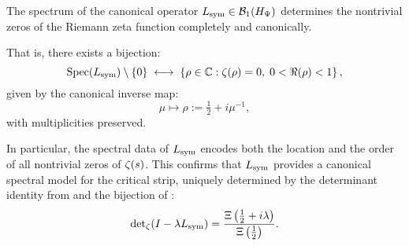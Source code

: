 \begin{corollary}
\label{cor:spectral_determines_zeta}

The spectrum of the canonical operator \( L_{\mathrm{sym}} \in \mathcal{B}_1(H_{\Psi}) \) determines the nontrivial zeros of the Riemann zeta function completely and canonically.

That is, there exists a bijection:
\[
\operatorname{Spec}(L_{\mathrm{sym}}) \setminus \{0\}
\;\longleftrightarrow\;
\left\{ \rho \in \mathbb{C} : \zeta(\rho) = 0, \; 0 < \Re(\rho) < 1 \right\},
\]
given by the canonical inverse map:
\[
\mu \mapsto \rho := \tfrac{1}{2} + i \mu^{-1},
\]
with multiplicities preserved.

\medskip

\noindent
In particular, the spectral data of \( L_{\mathrm{sym}} \) encodes both the location and the order of all nontrivial zeros of \( \zeta(s) \). This confirms that \( L_{\mathrm{sym}} \) provides a canonical spectral model for the critical strip, uniquely determined by the determinant identity from  and the bijection of :
\[
\det\nolimits_\zeta(I - \lambda L_{\mathrm{sym}}) = \frac{\Xi\left( \tfrac{1}{2} + i\lambda \right)}{\Xi\left( \tfrac{1}{2} \right)}.
\]
\end{corollary}
